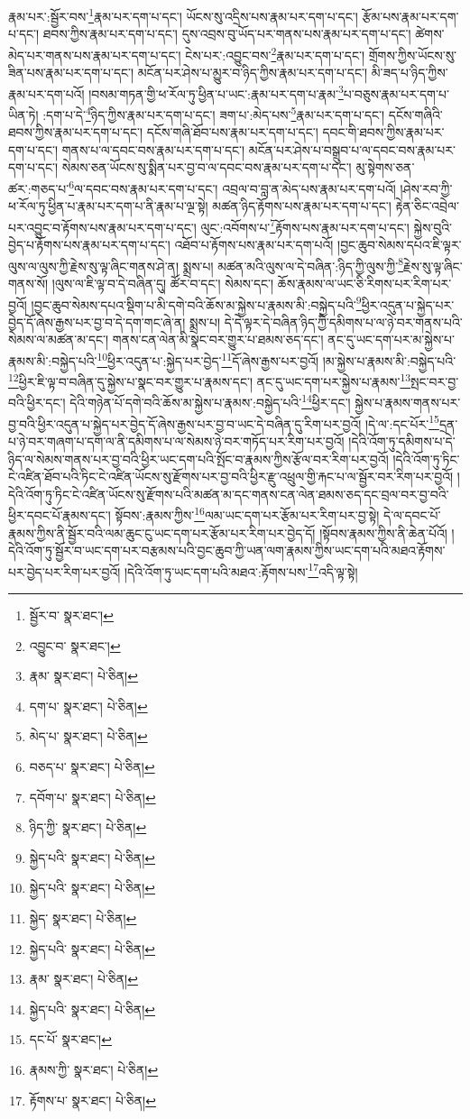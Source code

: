 རྣམ་པར་:སྦྱོར་བས་\footnote{སྦྱོར་བ་  སྣར་ཐང་། }རྣམ་པར་དག་པ་དང་། ཡོངས་སུ་འདྲིས་པས་རྣམ་པར་དག་པ་དང་། རྩོམ་པས་རྣམ་པར་དག་པ་དང་། ཐབས་ཀྱིས་རྣམ་པར་དག་པ་དང་། དུས་འབྲས་བུ་ཡོད་པར་གནས་པས་རྣམ་པར་དག་པ་དང་། ཚེགས་མེད་པར་གནས་པས་རྣམ་པར་དག་པ་དང་། ངེས་པར་:འབྱུང་བས་\footnote{འབྱུང་བ་  སྣར་ཐང་། }རྣམ་པར་དག་པ་དང་། གྲོགས་ཀྱིས་ཡོངས་སུ་ཟིན་པས་རྣམ་པར་དག་པ་དང་། མངོན་པར་ཤེས་པ་མྱུར་བ་ཉིད་ཀྱིས་རྣམ་པར་དག་པ་དང་། མི་ཟད་པ་ཉིད་ཀྱིས་རྣམ་པར་དག་པའོ། །བསམ་གཏན་གྱི་ཕ་རོལ་ཏུ་ཕྱིན་པ་ཡང་:རྣམ་པར་དག་པ་རྣམ་\footnote{རྣམ་  སྣར་ཐང་།  པེ་ཅིན། }པ་བཅུས་རྣམ་པར་དག་པ་ཡིན་ཏེ། :དག་པ་དེ་\footnote{དག་པ་  སྣར་ཐང་།  པེ་ཅིན། }ཉིད་ཀྱིས་རྣམ་པར་དག་པ་དང་། ཟག་པ་:མེད་པས་\footnote{མེད་པ་  སྣར་ཐང་།  པེ་ཅིན། }རྣམ་པར་དག་པ་དང་། དངོས་གཞིའི་ཐབས་ཀྱིས་རྣམ་པར་དག་པ་དང་། དངོས་གཞི་ཐོབ་པས་རྣམ་པར་དག་པ་དང་། དབང་གི་ཐབས་ཀྱིས་རྣམ་པར་དག་པ་དང་། གནས་པ་ལ་དབང་བས་རྣམ་པར་དག་པ་དང་། མངོན་པར་ཤེས་པ་བསྒྲུབ་པ་ལ་དབང་བས་རྣམ་པར་དག་པ་དང་། སེམས་ཅན་ཡོངས་སུ་སྨིན་པར་བྱ་བ་ལ་དབང་བས་རྣམ་པར་དག་པ་དང་། མུ་སྟེགས་ཅན་ཚར་:གཅད་པ་\footnote{བཅད་པ་  སྣར་ཐང་།  པེ་ཅིན། }ལ་དབང་བས་རྣམ་པར་དག་པ་དང་། འབྲལ་བ་བླ་ན་མེད་པས་རྣམ་པར་དག་པའོ། །ཤེས་རབ་ཀྱི་ཕ་རོལ་ཏུ་ཕྱིན་པ་རྣམ་པར་དག་པ་ནི་རྣམ་པ་ལྔ་སྟེ། མཚན་ཉིད་རྟོགས་པས་རྣམ་པར་དག་པ་དང་། རྟེན་ཅིང་འབྲེལ་པར་འབྱུང་བ་རྟོགས་པས་རྣམ་པར་དག་པ་དང་། ལུང་:འབོགས་པ་\footnote{དབོག་པ་  སྣར་ཐང་།  པེ་ཅིན། }རྟོགས་པས་རྣམ་པར་དག་པ་དང་། སྐྱེས་བུའི་བྱེད་པ་རྟོགས་པས་རྣམ་པར་དག་པ་དང་། འཐོབ་པ་རྟོགས་པས་རྣམ་པར་དག་པའོ། །བྱང་ཆུབ་སེམས་དཔའ་ཇི་ལྟར་ལུས་ལ་ལུས་ཀྱི་རྗེས་སུ་ལྟ་ཞིང་གནས་ཤེ་ན། སྨྲས་པ། མཚན་མའི་ལུས་ལ་དེ་བཞིན་:ཉིད་ཀྱི་ལུས་ཀྱི་\footnote{ཉིད་ཀྱི་  སྣར་ཐང་།  པེ་ཅིན། }རྗེས་སུ་ལྟ་ཞིང་གནས་སོ། །ལུས་ལ་ཇི་ལྟ་བ་དེ་བཞིན་དུ། ཚོར་བ་དང་། སེམས་དང་། ཆོས་རྣམས་ལ་ཡང་ཅི་རིགས་པར་རིག་པར་བྱའོ། །བྱང་ཆུབ་སེམས་དཔའ་སྡིག་པ་མི་དགེ་བའི་ཆོས་མ་སྐྱེས་པ་རྣམས་མི་:བསྐྱེད་པའི་\footnote{སྐྱེད་པའི་  སྣར་ཐང་།  པེ་ཅིན། }ཕྱིར་འདུན་པ་སྐྱེད་པར་བྱེད་དོ་ཞེས་རྒྱས་པར་བྱ་བ་དེ་དག་གང་ཞེ་ན། སྨྲས་པ། དེ་དེ་ལྟར་དེ་བཞིན་ཉིད་ཀྱི་དམིགས་པ་ལ་ཉེ་བར་གནས་པའི་སེམས་ལ་མཚན་མ་དང་། གནས་ངན་ལེན་མི་སྣང་བར་གྱུར་པ་ཐམས་ཅད་དང་། ནང་དུ་ཡང་དག་པར་མ་སྐྱེས་པ་རྣམས་མི་:བསྐྱེད་པའི་\footnote{སྐྱེད་པའི་  སྣར་ཐང་།  པེ་ཅིན། }ཕྱིར་འདུན་པ་:སྐྱེད་པར་བྱེད་\footnote{སྐྱེད་  སྣར་ཐང་།  པེ་ཅིན། }དོ་ཞེས་རྒྱས་པར་བྱའོ། །མ་སྐྱེས་པ་རྣམས་མི་:བསྐྱེད་པའི་\footnote{སྐྱེད་པའི་  སྣར་ཐང་།  པེ་ཅིན། }ཕྱིར་ཇི་ལྟ་བ་བཞིན་དུ་སྐྱེས་པ་སྣང་བར་གྱུར་པ་རྣམས་དང་། ནང་དུ་ཡང་དག་པར་སྐྱེས་པ་རྣམས་\footnote{རྣམ་  སྣར་ཐང་།  པེ་ཅིན། }སྤང་བར་བྱ་བའི་ཕྱིར་དང་། དེའི་གཉེན་པོ་དགེ་བའི་ཆོས་མ་སྐྱེས་པ་རྣམས་:བསྐྱེད་པའི་\footnote{སྐྱེད་པའི་  སྣར་ཐང་།  པེ་ཅིན། }ཕྱིར་དང་། སྐྱེས་པ་རྣམས་གནས་པར་བྱ་བའི་ཕྱིར་འདུན་པ་སྐྱེད་པར་བྱེད་དོ་ཞེས་རྒྱས་པར་བྱ་བ་ཡང་དེ་བཞིན་དུ་རིག་པར་བྱའོ། །དེ་ལ་:དང་པོར་\footnote{དང་པོ་  སྣར་ཐང་། }དྲན་པ་ཉེ་བར་གཞག་པ་དག་ལ་ནི་དམིགས་པ་ལ་སེམས་ཉེ་བར་གཏོད་པར་རིག་པར་བྱའོ། །དེའི་འོག་ཏུ་དམིགས་པ་དེ་ཉིད་ལ་སེམས་གནས་པར་བྱ་བའི་ཕྱིར་ཡང་དག་པའི་སྤོང་བ་རྣམས་ཀྱིས་རྩོལ་བར་རིག་པར་བྱའོ། །དེའི་འོག་ཏུ་ཏིང་ངེ་འཛིན་ཐོབ་པའི་ཏིང་ངེ་འཛིན་ཡོངས་སུ་རྫོགས་པར་བྱ་བའི་ཕྱིར་རྫུ་འཕྲུལ་གྱི་རྐང་པ་ལ་སྦྱོར་བར་རིག་པར་བྱའོ། །དེའི་འོག་ཏུ་ཏིང་ངེ་འཛིན་ཡོངས་སུ་རྫོགས་པའི་མཚན་མ་དང་གནས་ངན་ལེན་ཐམས་ཅད་དང་བྲལ་བར་བྱ་བའི་ཕྱིར་དབང་པོ་རྣམས་དང་། སྟོབས་:རྣམས་ཀྱིས་\footnote{རྣམས་ཀྱི་  སྣར་ཐང་།  པེ་ཅིན། }ལམ་ཡང་དག་པར་རྩོམ་པར་རིག་པར་བྱ་སྟེ། དེ་ལ་དབང་པོ་རྣམས་ཀྱིས་ནི་སྦྱོར་བའི་ལམ་ཆུང་ངུ་ཡང་དག་པར་རྩོམ་པར་རིག་པར་བྱེད་དོ། །སྟོབས་རྣམས་ཀྱིས་ནི་ཆེན་པོའོ། །དེའི་འོག་ཏུ་སྦྱོར་བ་ཡང་དག་པར་བརྩམས་པའི་བྱང་ཆུབ་ཀྱི་ཡན་ལག་རྣམས་ཀྱིས་ཡང་དག་པའི་མཐའ་རྟོགས་པར་བྱེད་པར་རིག་པར་བྱའོ། །དེའི་འོག་ཏུ་ཡང་དག་པའི་མཐའ་:རྟོགས་པས་\footnote{རྟོགས་པ་  སྣར་ཐང་།  པེ་ཅིན། }འདི་ལྟ་སྟེ། 